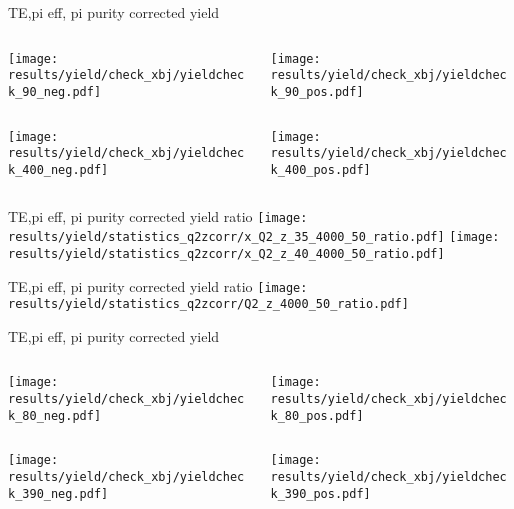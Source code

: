 \begin{frame}{TE,pi eff, pi purity corrected yield}
\begin{columns}
\begin{column}[T]{0.5\textwidth}
\texttt{[image: results/yield/check\_xbj/yieldcheck\_90\_neg.pdf]}
\end{column}
\begin{column}[T]{0.5\textwidth}
\texttt{[image: results/yield/check\_xbj/yieldcheck\_90\_pos.pdf]}
\end{column}
\end{columns}
\begin{columns}
\begin{column}[T]{0.5\textwidth}
\texttt{[image: results/yield/check\_xbj/yieldcheck\_400\_neg.pdf]}
\end{column}
\begin{column}[T]{0.5\textwidth}
\texttt{[image: results/yield/check\_xbj/yieldcheck\_400\_pos.pdf]}
\end{column}
\end{columns}
\end{frame}
\begin{frame}{TE,pi eff, pi purity corrected yield ratio}
\texttt{[image: results/yield/statistics\_q2zcorr/x\_Q2\_z\_35\_4000\_50\_ratio.pdf]}
\texttt{[image: results/yield/statistics\_q2zcorr/x\_Q2\_z\_40\_4000\_50\_ratio.pdf]}
\end{frame}
\begin{frame}{TE,pi eff, pi purity corrected yield ratio}
\texttt{[image: results/yield/statistics\_q2zcorr/Q2\_z\_4000\_50\_ratio.pdf]}
\end{frame}
\begin{frame}{TE,pi eff, pi purity corrected yield}
\begin{columns}
\begin{column}[T]{0.5\textwidth}
\texttt{[image: results/yield/check\_xbj/yieldcheck\_80\_neg.pdf]}
\end{column}
\begin{column}[T]{0.5\textwidth}
\texttt{[image: results/yield/check\_xbj/yieldcheck\_80\_pos.pdf]}
\end{column}
\end{columns}
\begin{columns}
\begin{column}[T]{0.5\textwidth}
\texttt{[image: results/yield/check\_xbj/yieldcheck\_390\_neg.pdf]}
\end{column}
\begin{column}[T]{0.5\textwidth}
\texttt{[image: results/yield/check\_xbj/yieldcheck\_390\_pos.pdf]}
\end{column}
\end{columns}
\end{frame}
